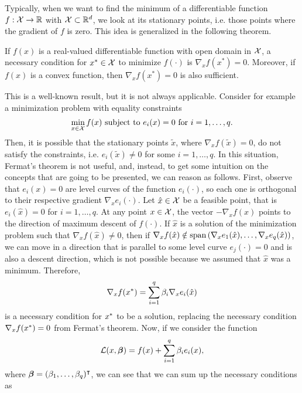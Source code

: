 Typically, when we want to find the minimum of a differentiable function $f: \mathcal{X} \to \mathbb{R}$ with $\mathcal{X} \subset \mathbb{R}^d$, we look at its stationary points, i.e. those points where the gradient of $f$ is zero. This idea is generalized in the following theorem.
\begin{theorem}
    If $f(x)$ is a real-valued differentiable function with open domain in $\mathcal{X}$, a necessary condition for $x^* \in \mathcal{X}$ to minimize $f(\cdot)$ is $\nabla_x f(x^*) = 0$. Moreover, if $f(x)$ is a convex function, then $\nabla_x f(x^*) = 0$ is also sufficient.
\end{theorem}
This is a well-known result, but it is not always applicable. Consider for example a minimization problem with equality constraints
$$ \min_{x \in \mathcal{X}} f(x) \text{ subject to } e_i(x)=0 \text{ for } i=1, \ldots, q .$$
Then, it is possible that the stationary points $\tilde{x}$, where $\nabla_x f(\tilde{x}) = 0$, do not satisfy the constraints, i.e. $e_i(\tilde{x}) \neq 0$ for some $i=1, \ldots, q$. In this situation, Fermat's theorem is not useful, and, instead, to get some intuition on the concepts that are going to be presented, we can reason as follows. 
%
First, observe that $e_i(x)=0$ are level curves of the function $e_i(\cdot)$, so each one is orthogonal to their respective gradient $\nabla_x e_i(\cdot)$.  Let $\hat{x} \in \mathcal{X}$ be a feasible point, that is $e_i(\hat{x})=0$ for $i=1, \ldots, q$.
At any point $x \in \mathcal{X}$, the vector $-\nabla_x f(x)$ points to the direction of maximum descent of $f(\cdot)$.
If $\hat{x}$ is a solution of the minimization problem such that $\nabla_x f(\hat{x}) \neq 0$, then if $\nabla_x f(\hat{x}) \notin \operatorname{span}\left(\nabla_x e_1(\hat{x}), \ldots, \nabla_x e_q(\hat{x}) \right)$, we can move in a direction that is parallel to some level curve $e_j(\cdot)=0$ and is also a descent direction, which is not possible because we assumed that $\hat{x}$ was a minimum.
Therefore,
\begin{equation}
    \label{eq:intuition_lagr}
    \nabla_x f(\opt{x}) = \sum_{i=1}^q \beta_i \nabla_x e_i(\hat{x})
\end{equation}
is a necessary condition for ${x}^*$ to be a solution, replacing the necessary condition $\nabla_x f({x}^*) = 0$ from Fermat's theorem.
%
Now, if we consider the function $$\mathcal{L}(x, \bm{\beta}) = f(x) + \sum_{i=1}^q \beta_i e_i(x),$$ where $\bm{\beta} = (\beta_1, \ldots, \beta_q)^\intercal$, we can see that we can sum up the necessary conditions as 
